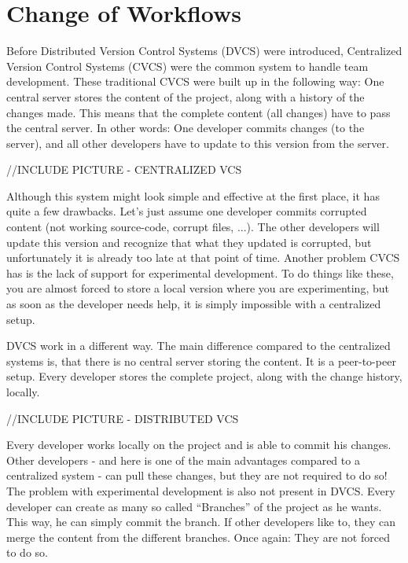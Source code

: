 \section {Change of Workflows}

Before Distributed Version Control Systems (DVCS) were introduced, Centralized Version Control Systems (CVCS) were the common system to handle team development.
These traditional CVCS were built up in the following way: One central server stores the content of the project, along with a history of the changes made. This means that the complete content (all changes) have to pass the central server. In other words: One developer commits changes (to the server), and all other developers have to update to this version from the server.

//INCLUDE PICTURE - CENTRALIZED VCS

Although this system might look simple and effective at the first place, it has quite a few drawbacks. Let's just assume one developer commits corrupted content (not working source-code, corrupt files, ...).
The other developers will update this version and recognize that what they updated is corrupted, but unfortunately it is already too late at that point of time.
Another problem CVCS has is the lack of support for experimental development. To do things like these, you are almost forced to store a local version where you are experimenting,
but as soon as the developer needs help, it is simply impossible with a centralized setup.


DVCS work in a different way. The main difference compared to the centralized systems is, that there is no central server storing the content.
It is a peer-to-peer setup. Every developer stores the complete project, along with the change history, locally. 

//INCLUDE PICTURE - DISTRIBUTED VCS

Every developer works locally on the
project and is able to commit his changes. Other developers - and here is one of the main advantages compared to a centralized system - can pull these changes,
but they are not required to do so!
The problem with experimental development is also not present in DVCS. Every developer can create as many so called "`Branches"' of the project as he wants. This way, he can simply commit the branch. If other developers like to, they can merge the content from the different branches. Once again: They are not forced to do so.

\cite{branchingstrategies2010}